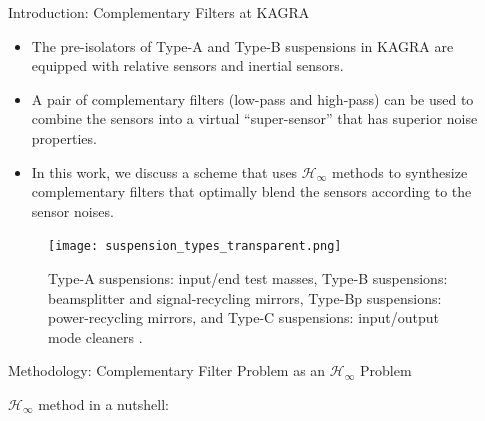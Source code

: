 \documentclass{beamer}
\begin{document}
\begin{frame}[t]
	\begin{columns}[t]
		
		\begin{column}{0.32\linewidth}	
			\begin{block}{Introduction: Complementary Filters at KAGRA}
				\begin{itemize}
					\item The pre-isolators of Type-A and Type-B suspensions in KAGRA are equipped with relative sensors and inertial sensors.
					\item A pair of complementary filters (low-pass and high-pass) can be used to combine the sensors into a virtual ``super-sensor'' that has superior noise properties.
					\item In this work, we discuss a scheme that uses $\mathcal{H}_\infty$ methods to synthesize  complementary filters that optimally blend the sensors according to the sensor noises.
				\end{itemize}
					
				\medskip

				\begin{figure}
					\centering
					\texttt{[image: suspension\_types\_transparent.png]}
					\caption{Type-A suspensions: input/end test masses, Type-B suspensions: beamsplitter and signal-recycling mirrors, Type-Bp suspensions: power-recycling mirrors, and Type-C suspensions: input/output mode cleaners \cite{Akutsu:2021auw}.}
					\label{fig:suspension_types}
				\end{figure}
			\end{block}
				
			\begin{block}{Methodology: Complementary Filter Problem as an $\mathcal{H}_\infty$ Problem}
				
					$\mathcal{H}_\infty$ method in a nutshell:
					

\end{block}
\end{column}
\end{columns}
\end{frame}
\end{document}

